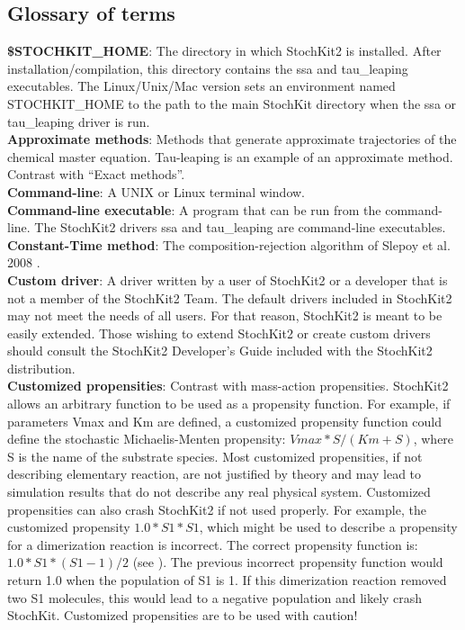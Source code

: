 \documentclass[11pt,letterpaper]{article}
\begin{document}
\begin{itemize}
\clearpage
\section{Glossary of terms}

\textbf{\$STOCHKIT\_HOME}: The directory in which StochKit2 is installed.  After installation/compilation, this directory contains the ssa and tau\_leaping executables.  The Linux/Unix/Mac version sets an environment named STOCHKIT\_HOME to the path to the main StochKit directory when the ssa or tau\_leaping driver is run.
\\\textbf{Approximate methods}: Methods that generate approximate trajectories of the chemical master equation.  Tau-leaping is an example of an approximate method.  Contrast with “Exact methods”.
\\\textbf{Command-line}: A UNIX or Linux terminal window.
\\\textbf{Command-line executable}: A program that can be run from the command-line.  The StochKit2 drivers ssa and tau\_leaping are command-line executables.
\\\textbf{Constant-Time method}: The composition-rejection algorithm of Slepoy et al. 2008 \cite{Slepoy2008}.
\\\textbf{Custom driver}: A driver written by a user of StochKit2 or a developer that is not a member of the StochKit2 Team.  The default drivers included in StochKit2 may not meet the needs of all users.  For that reason, StochKit2 is meant to be easily extended.  Those wishing to extend StochKit2 or create custom drivers should consult the StochKit2 Developer's Guide included with the StochKit2 distribution.
\\\textbf{Customized propensities}: Contrast with mass-action propensities.  StochKit2 allows an arbitrary function to be used as a propensity function.  For example, if parameters Vmax and Km are defined, a customized propensity function could define the stochastic Michaelis-Menten propensity: $Vmax*S/(Km+S)$, where S is the name of the substrate species.  Most customized propensities, if not describing elementary reaction, are not justified by theory and may lead to simulation results that do not describe any real physical system.  Customized propensities can also crash StochKit2 if not used properly.  For example, the customized propensity $1.0*S1*S1$, which might be used to describe a propensity for a dimerization reaction is incorrect.  The correct propensity function is: $1.0*S1*(S1-1)/2$ (see \cite{Gillespie1977}).  The previous incorrect propensity function would return 1.0 when the population of S1 is 1.  If this dimerization reaction removed two S1 molecules, this would lead to a negative population and likely crash StochKit.  Customized propensities are to be used with caution!

\end{itemize}
\end{document}
